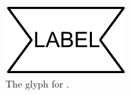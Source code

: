 \begin{figure}[H]
  \centering
  \includegraphics{images/perturbing_agent}
  \caption{The \PD glyph for .}
  \label{fig:perturbing_agent}
\end{figure}


